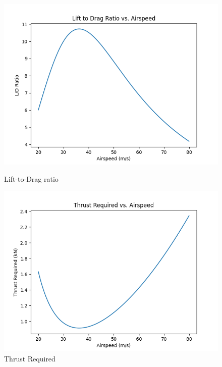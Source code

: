 \documentclass[letterpaper,12pt]{article}
\begin{document}
\begin{figure}[H]
\centering
    \begin{minipage}{0.45\textwidth}
        \centering
        \includegraphics[scale=0.5]{perf_LD} %
        \caption{Lift-to-Drag ratio}
    \end{minipage}
    \begin{minipage}{0.5\textwidth}
        \centering
        \includegraphics[scale=0.5]{perf_TR} %
        \caption{Thrust Required}
    \end{minipage}
\end{figure}
\end{document}
